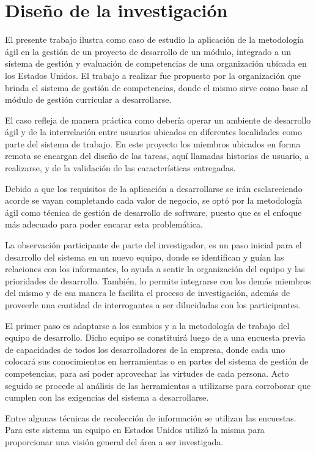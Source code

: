 \section{Diseño de la investigación}
El presente trabajo ilustra como caso de estudio la aplicación de la metodología ágil en la gestión de un proyecto de desarrollo de un módulo, integrado a un sistema de gestión y evaluación de competencias de una organización ubicada en los Estados Unidos. El trabajo a realizar fue propuesto por la organización que brinda el sistema de gestión de competencias, donde el mismo sirve como base al módulo de gestión curricular a desarrollarse.

El caso refleja de manera práctica como debería operar un ambiente de desarrollo ágil y de la interrelación entre usuarios ubicados en diferentes localidades como parte del sistema de trabajo. En este proyecto los miembros ubicados en forma remota se encargan del diseño de las tareas, aquí llamadas historias de usuario, a realizarse, y de la validación de las características entregadas.

Debido a que los requisitos de la aplicación a desarrollarse se irán esclareciendo acorde se vayan completando cada valor de negocio, se optó por la metodología ágil como técnica de gestión de desarrollo de software, puesto que es el enfoque más adecuado para poder encarar esta problemática.

La observación participante de parte del investigador, es un paso inicial para el desarrollo del sistema en un nuevo equipo, donde se identifican y guían las relaciones con los informantes, lo ayuda a sentir la organización del equipo y las prioridades de desarrollo. También, lo permite integrarse con los demás miembros del mismo y de esa manera le facilita el proceso de investigación, además de proveerle una cantidad de interrogantes a ser dilucidadas con los participantes\citep{erlandson_doing_1993}.

El primer paso es adaptarse a los cambios y a la metodología de trabajo del equipo de desarrollo. Dicho equipo se constituirá luego de a una encuesta previa de capacidades de todos los desarrolladores de la empresa, donde cada uno colocará sus conocimientos en herramientas o en partes del sistema de gestión de competencias, para así poder aprovechar las virtudes de cada persona. Acto seguido se procede al análisis de las herramientas a utilizarse para corroborar que cumplen con las exigencias del sistema a desarrollarse.

Entre algunas técnicas de recolección de información se utilizan las encuestas\citep{robson_real_2011}. Para este sistema un equipo en Estados Unidos utilizó la misma para proporcionar una visión general del área a ser investigada. 

